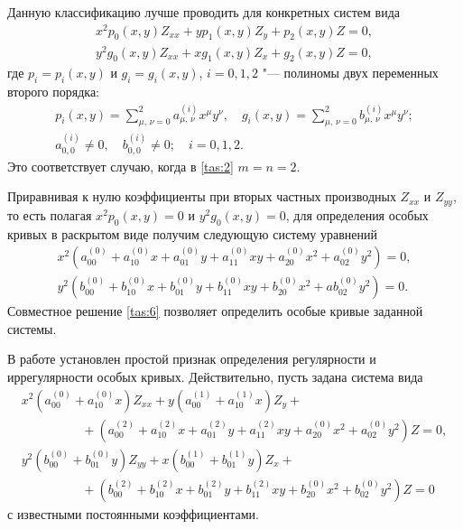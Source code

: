 \smallskip

Данную классификацию лучше проводить для конкретных систем вида
\begin{equation}
\begin{array}{l}
x^{2}   p_{0}(x,y)   Z_{xx}+y   p_{1}(x,y)  
Z_{y}+p_{2}(x,y)  
Z=0,\\[0.2cm]
y^{2}   g_{0}(x,y)   Z_{xx}+x   g_{1}(x,y)  
Z_{x}+g_{2}(x,y)   Z=0,
\end{array}
\label{tas:4}
\end{equation}
где $p_{i}=p_{i}(x,y)$ и $g_{i}=g_{i}(x,y)$, $i=0, 1, 2$ "---
полиномы двух переменных второго порядка:
\begin{equation}
\begin{array}{c}
p_{i}(x,y)=\displaystyle \sum_{\mu,\,\nu=0}^2
a_{\mu,\,\nu}^{(i)}   x^{\mu}   y^{\nu}, \quad
g_{i}(x,y)=\displaystyle \sum_{\mu,\,\nu=0}^2
b_{\mu,\,\nu}^{(i)}   x^{\mu}   y^{\nu}; \\ a_{0,0}^{(i)}\neq 0, \quad  b_{0,0}^{(i)}\neq 0;\quad  i=0, 1, 2.
\end{array}
\label{tas:5}
\end{equation}
Это соответствует случаю, когда в \eqref{tas:2} $m=n=2$.

Приравнивая к нулю коэффициенты при вторых частных производных
$Z_{xx}$ и $Z_{yy}$, то есть полагая $x^{2}   p_{0}(x,y)=0$ и
$y^{2}   g_{0}(x,y)=0$, для определения особых кривых в
раскрытом виде получим следующую систему уравнений
\begin{equation}
\begin{array}{l}
x^{2}   \left(a_{00}^{(0)}+a_{10}^{(0)}   x+
a_{01}^{(0)}   y+a_{11}^{(0)}   xy+a_{20}^{(0)}  
x^{2}+a_{02}^{(0)}   y^{2}\right)=0,\\[0.2cm]
y^{2}   \left(b_{00}^{(0)}+b_{10}^{(0)}   x+
b_{01}^{(0)}   y+b_{11}^{(0)}   xy+b_{20}^{(0)}  
x^{2}+ab_{02}^{(0)}   y^{2}\right)=0.
\end{array}
\label{tas:6}
\end{equation}
Совместное решение \eqref{tas:6} позволяет определить особые кривые
заданной системы.

В работе \cite{tas:bib:6} установлен простой признак определения регулярности и иррегулярности особых кривых. 
Действительно, пусть задана система вида
\begin{equation}
\begin{array}{l}
x^{2}   (a_{00}^{(0)}+a_{10}^{(0)}   x)   Z_{xx}+y  
(a_{00}^{(1)}+a_{10}^{(1)}   x)  
Z_{y}+ \\[0.1cm]
\hspace{2cm} + (a_{00}^{(2)}+a_{10}^{(2)}   x+a_{01}^{(2)}  
y+a_{11}^{(2)}   xy+a_{20}^{(0)}  
x^{2}+a_{02}^{(0)}   y^{2})   Z=0,\\[0.1cm]
y^{2}   (b_{00}^{(0)}+b_{01}^{(0)}   y)   Z_{yy}+x  
(b_{00}^{(1)}+b_{01}^{(1)}   y)  
Z_{x}+ \\[0.1cm]
\hspace{2cm}+(b_{00}^{(2)}+b_{10}^{(2)}   x+b_{01}^{(2)}  
y+b_{11}^{(2)}   xy+b_{20}^{(0)}  
x^{2}+b_{02}^{(0)}   y^{2})   Z=0
\end{array}
\label{tas:7}
\end{equation}
с известными постоянными коэффициентами.

